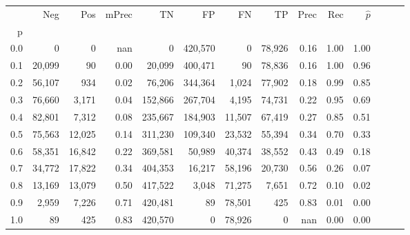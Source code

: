\begin{tabular}{rrrrrrrrrrrrrr}
\toprule
{} &     Neg &     Pos & mPrec &       TN &       FP &      FN &      TP &  Prec &   Rec & $\hat{p}$ \\
p   &         &         &       &          &          &         &         &       &       &           \\
\midrule
0.0 &       0 &       0 &   nan &        0 &  420,570 &       0 &  78,926 &  0.16 &  1.00 &      1.00 \\
0.1 &  20,099 &      90 &  0.00 &   20,099 &  400,471 &      90 &  78,836 &  0.16 &  1.00 &      0.96 \\
0.2 &  56,107 &     934 &  0.02 &   76,206 &  344,364 &   1,024 &  77,902 &  0.18 &  0.99 &      0.85 \\
0.3 &  76,660 &   3,171 &  0.04 &  152,866 &  267,704 &   4,195 &  74,731 &  0.22 &  0.95 &      0.69 \\
0.4 &  82,801 &   7,312 &  0.08 &  235,667 &  184,903 &  11,507 &  67,419 &  0.27 &  0.85 &      0.51 \\
0.5 &  75,563 &  12,025 &  0.14 &  311,230 &  109,340 &  23,532 &  55,394 &  0.34 &  0.70 &      0.33 \\
0.6 &  58,351 &  16,842 &  0.22 &  369,581 &   50,989 &  40,374 &  38,552 &  0.43 &  0.49 &      0.18 \\
0.7 &  34,772 &  17,822 &  0.34 &  404,353 &   16,217 &  58,196 &  20,730 &  0.56 &  0.26 &      0.07 \\
0.8 &  13,169 &  13,079 &  0.50 &  417,522 &    3,048 &  71,275 &   7,651 &  0.72 &  0.10 &      0.02 \\
0.9 &   2,959 &   7,226 &  0.71 &  420,481 &       89 &  78,501 &     425 &  0.83 &  0.01 &      0.00 \\
1.0 &      89 &     425 &  0.83 &  420,570 &        0 &  78,926 &       0 &   nan &  0.00 &      0.00 \\
\bottomrule
\end{tabular}
